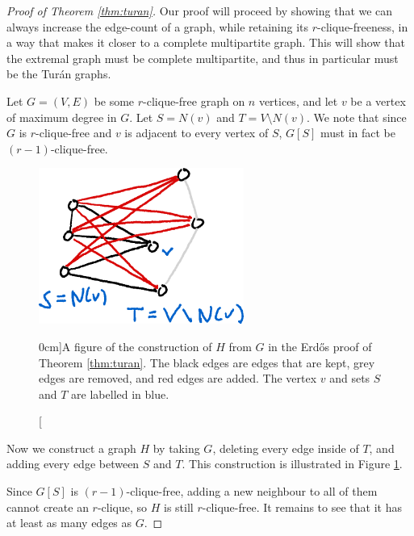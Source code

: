 \documentclass[nobib]{tufte-handout}
\begin{document}
\begin{proof}[Proof of Theorem \ref{thm:turan}]
    Our proof will proceed by showing that we can always increase the edge-count of a graph, while retaining its $r$-clique-freeness, in a way that makes it closer to a complete multipartite graph. This will show that the extremal graph must be complete multipartite, and thus in particular must be the Turán graphs.

    Let $G = (V,E)$ be some $r$-clique-free graph on $n$ vertices, and let $v$ be a vertex of maximum degree in $G$. Let $S = N(v)$ and $T = V \setminus N(v)$. We note that since $G$ is $r$-clique-free and $v$ is adjacent to every vertex of $S$, $G[S]$ must in fact be $(r-1)$-clique-free.

    \begin{figure}
        \centering
        \includegraphics[width=0.6\textwidth]{graphics/L18_extremal_szemeredi/erdos_turan_proof.png}
        \caption[][0cm]{A figure of the construction of $H$ from $G$ in the Erd\H{o}s proof of Theorem \ref{thm:turan}. The black edges are edges that are kept, grey edges are removed, and red edges are added. The vertex $v$ and sets $S$ and $T$ are labelled in blue.}
        \label{fig:erdos_turan_proof}
    \end{figure}

    Now we construct a graph $H$ by taking $G$, deleting every edge inside of $T$, and adding every edge between $S$ and $T$. This construction is illustrated in Figure \ref{fig:erdos_turan_proof}.

    Since $G[S]$ is $(r-1)$-clique-free, adding a new neighbour to all of them cannot create an $r$-clique, so $H$ is still $r$-clique-free. It remains to see that it has at least as many edges as $G$.


\end{proof}
\end{document}
